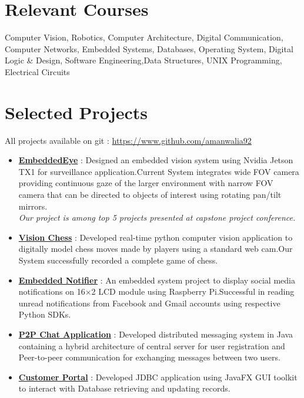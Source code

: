\documentclass[margin, centered]{res}
\begin{document}
\begin{resume}
		\section{Relevant \hspace{2mm} Courses}
		
		Computer Vision, Robotics, Computer Architecture, Digital Communication, Computer Networks, Embedded Systems, Databases, Operating System, Digital Logic \& Design, Software Engineering,Data Structures, UNIX Programming, Electrical Circuits 
		
		\section{Selected Projects}
		All projects available on git : \url{https://www.github.com/amanwalia92}\\
		\begin{itemize}[leftmargin=*]
			\item \textbf{\href{https://github.com/amanwalia92/EmbeddedEye}{EmbeddedEye}} : Designed an embedded vision system using Nvidia Jetson TX1 for surveillance application.Current System integrates wide FOV camera providing continuous gaze of the larger environment with narrow FOV camera that can be directed to objects of interest using rotating pan/tilt mirrors. \\
			\textit{Our project is among top 5 projects presented at capstone project conference.} 
			\item \textbf{\href{https://github.com/amanwalia92/VisionChess}{Vision Chess}} : Developed real-time python computer vision application to digitally model chess moves made by players using a standard web cam.Our System successfully recorded a complete game of chess.
			\item \textbf{\href{https://github.com/amanwalia92/EmbeddedNotifier}{Embedded Notifier}} : An embedded system project to display social media notifications on 16$\times$2 LCD module using Raspberry  Pi.Successful in reading unread notifications from Facebook and Gmail accounts using respective Python SDKs.
			\item \textbf{\href{https://github.com/amanwalia92/Multi-Threaded-Chat-Network}{P2P Chat Application}} : Developed distributed messaging system in Java containing a hybrid architecture of central server for user registration and Peer-to-peer communication for exchanging messages between two users.
			\item \textbf{\href{https://github.com/amanwalia92/Multi-Threaded-Chat-Network}{Customer Portal}} : Developed JDBC application using JavaFX GUI toolkit to interact with Database retrieving and updating records.
		\end{itemize}
		

\end{resume}
\end{document}
